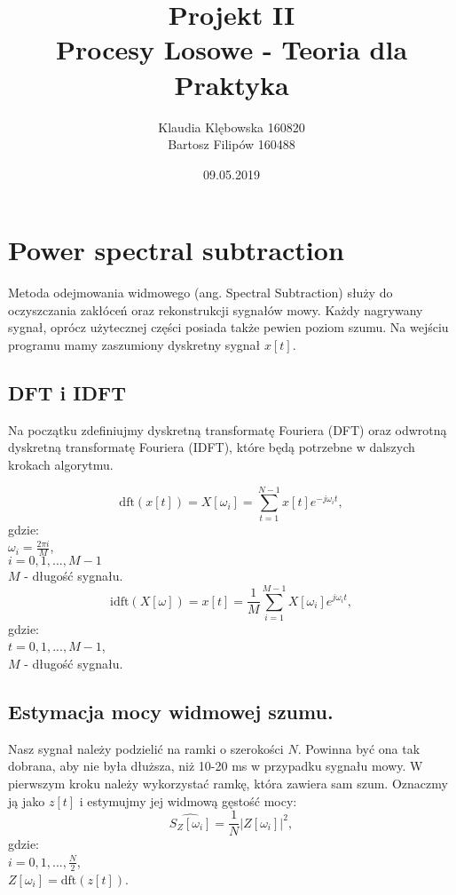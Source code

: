 \documentclass[11pt,a4paper,twoside]{article}
\title{Projekt II \\ \large Procesy Losowe - Teoria dla Praktyka}
\author{Klaudia Klębowska 160820 \\ Bartosz Filipów 160488}
\date{09.05.2019}
\begin{document}
	
\maketitle

\section{Power spectral subtraction}
Metoda odejmowania widmowego (ang. Spectral Subtraction) służy do oczyszczania zakłóceń oraz rekonstrukcji sygnałów mowy. 
Każdy nagrywany sygnał, oprócz użytecznej części posiada także pewien poziom szumu. Na wejściu programu mamy zaszumiony dyskretny sygnał $x[t]$. 

\subsection{DFT i IDFT}
Na początku zdefiniujmy dyskretną transformatę Fouriera (DFT) oraz odwrotną dyskretną transformatę Fouriera (IDFT), które będą potrzebne w dalszych krokach algorytmu.

\begin{equation}	
\mathrm{dft}(x[t])=X[\omega_{i}]= \sum_{t=1}^{N-1} x[t]e^{-j\omega_{i}t},
\end{equation}gdzie: \\
$\omega_{i}=\frac{2\pi i}{M}$, \\
$ i = 0,1,..., M-1$ \\
$ M $ - długość sygnału. \\

\begin{equation}
\mathrm{idft}(X[\omega])=x[t]= \frac{1}{M}\sum_{i=1}^{M-1} X[\omega_{i}]e^{j\omega_{i}t},
\end{equation}
gdzie: \\
$t = 0,1,...,M-1$, \\
$M$ - długość sygnału. \\


\subsection{Estymacja mocy widmowej szumu.}
Nasz sygnał należy podzielić na ramki o szerokości $N$. Powinna być ona tak dobrana, aby nie była dłuższa, niż 10-20 ms w przypadku sygnału mowy. W pierwszym kroku należy wykorzystać ramkę, która zawiera sam szum. Oznaczmy ją jako $z[t]$ i estymujmy jej widmową gęstość mocy: 
\begin{equation}
	\widehat{S_{Z}[\omega_{i}]} = \frac{1}{N}|Z[\omega_{i}]|^2,
\end{equation} 
gdzie: \\
$i = 0,1,...,\frac{N}{2}$, \\
$Z[\omega_{i}] = \mathrm{dft}(z[t])$.\\
\end{document}
